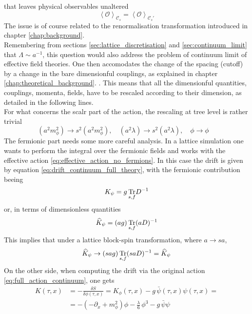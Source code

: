 that leaves physical observables unaltered
\begin{equation}
\left\langle\mathcal{O}\right\rangle_{\mathcal{C}_s} = \left\langle\mathcal{O}\right\rangle_{\mathcal{C}_s'}
\end{equation}
The issue is of course related to the renormalisation transformation introduced in chapter \ref{chap:background}. \\
Remembering from sections \ref{sec:lattice_discretisation} and \ref{sec:continuum_limit} that $\Lambda \sim a^{-1}$, this question would also address the problem of continuum limit of effective field theories. 
One then accomodates the change of the spacing (cutoff) by a change in the bare dimensionful couplings, as explained in chapter \ref{chap:theoretical_background}. . This means that all the dimensionful quantities, couplings, momenta, fields, have to be rescaled according to their dimension, as detailed in the following lines. \\
For what concerns the scalr part of the action, the rescaling at tree level is rather trivial \cite{Pawlowski2017CoolingNoise, attanasio2022low}
\begin{equation*}
    (a^2m_\phi^2) \to s^2(a^2m_\phi^2), \quad (a^2\lambda) \to s^2 (a^2\lambda), \quad \phi \to \phi \quad
\end{equation*}
The fermionic part needs some more careful analysis. 
In a lattice simulation one wants to perform the integral over the fermionic fields and works with the effective action \eqref{eq:effective_action_no_fermions}. In this case the drift is given by equation \eqref{eq:drift_continuum_full_theory}, with the fermionic contribution beeing
\begin{equation}
    	K_{\psi} = g \, \underset{s,f}{\operatorname{\text{Tr}}}{D^{-1}}
	\label{eq:fermionic_drift_contribution}
\end{equation}
or, in terms of dimensionless quantities
\begin{equation*}
    \widehat{K}_{\psi} = (ag) \, \underset{s,f}{\operatorname{\text{Tr}}}{(aD)^{-1}}
\end{equation*}
This implies that under a lattice block-spin transformation, where $a \to sa$,
\begin{equation}
    \widehat{K}_{\psi} \to  (sag) \, \underset{s,f}{\operatorname{\text{Tr}}}{(saD)^{-1}} = \widehat{K}_{\psi}
    \label{eq:fermionic_rescaling_naive}
\end{equation}
On the other side, when computing the drift via the original action \eqref{eq:full_action_continuum}, one gets
\begin{equation}
    \begin{aligned}
        K(\tau, x) &= - \frac{\delta S}{\delta \phi(\tau, x)} = K_\phi(\tau, x) - g \, \bar\psi(\tau, x)\psi(\tau,x) = \\
        &= -\left(-\partial_x + m_\phi^2\right) \phi - \frac{\lambda}{6} \, \phi^3 - g \, \bar\psi\psi
    \end{aligned}
    \label{eq:drift_continuum_from_full_action}
\end{equation}
